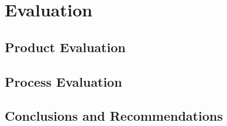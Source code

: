 \part{Evaluation}
	\chapter{Product Evaluation}
	\chapter{Process Evaluation}
	\chapter{Conclusions and Recommendations}